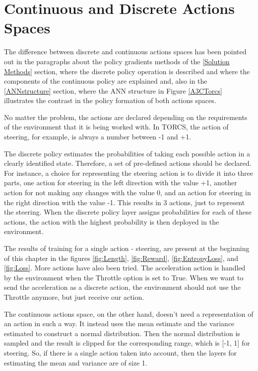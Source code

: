 \section{Continuous and Discrete Actions Spaces}\label{ContinuousDiscreteActionsSpaces}
The difference between discrete and continuous actions spaces has been pointed out in the paragraphs about the policy gradients methods of the \ref{Solution Methods} section, where the discrete policy operation is described and where the components of the continuous policy are explained and, also in the \ref{ANNstructure} section, where the ANN structure in Figure \ref{A3CTorcs} illustrates the contrast in the policy formation of both actions spaces.

No matter the problem, the actions are declared depending on the requirements of the environment that it is being worked with. In TORCS, the action of steering, for example, is always a number between -1 and +1.

The discrete policy estimates the probabilities of taking each possible action in a clearly identified state. Therefore, a set of pre-defined actions should be declared. For instance, a choice for representing the steering action is to divide it into three parts, one action for steering in the left direction with the value +1, another action for not making any changes with the value 0, and an action for steering in the right direction with the value -1. This results in 3 actions, just to represent the steering. When the discrete policy layer assigns probabilities for each of these actions, the action with the highest probability is then deployed in the environment.

The results of training for a single action - steering, are present at the beginning of this chapter in the figures \ref{fig:Length}, \ref{fig:Reward}, \ref{fig:EntropyLoss}, and \ref{fig:Loss}. More actions have also been tried. The acceleration action is handled by the environment when the Throttle option is set to True. When we want to send the acceleration as a discrete action, the environment should not use the Throttle anymore, but just receive our action.

The continuous actions space, on the other hand, doesn't need a representation of an action in such a way. It instead uses the mean estimate and the variance estimated to construct a normal distribution. Then the normal distribution is sampled and the result is clipped for the corresponding range, which is [-1, 1] for steering. So, if there is a single action taken into account, then the layers for estimating the mean and variance are of size 1.

